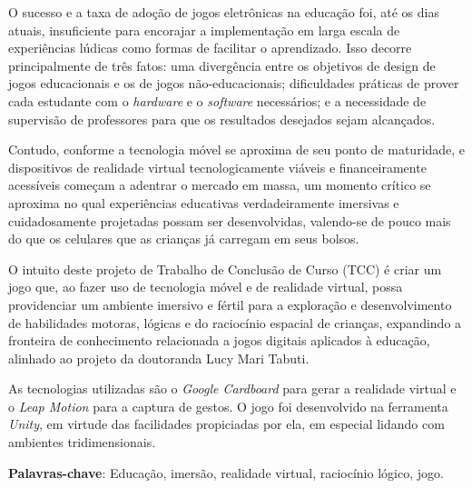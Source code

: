 \begin{resumo}
\begin{comment}
O resumo deve ser redigido, preferencialmente, na terceira pessoa do singular com verbo na voz ativa, em parágrafo único, e conter no máximo 500 palavras.
\end{comment}

O sucesso e a taxa de adoção de jogos eletrônicas na educação foi, 
até os dias atuais, insuficiente para encorajar a implementação 
em larga escala de experiências lúdicas como formas de facilitar 
o aprendizado. Isso decorre principalmente de três fatos: 
uma divergência entre os objetivos de design de jogos 
educacionais e os de jogos não-educacionais; dificuldades 
práticas de prover cada estudante com o \textit{hardware} e o \textit{software} 
necessários; e a necessidade de supervisão de professores 
para que os resultados desejados sejam alcançados.

Contudo, conforme a tecnologia móvel se aproxima de seu ponto 
de maturidade, e dispositivos de realidade virtual tecnologicamente 
viáveis e financeiramente acessíveis começam a adentrar o 
mercado em massa, um momento crítico se aproxima no qual 
experiências educativas verdadeiramente imersivas e cuidadosamente 
projetadas possam ser desenvolvidas, valendo-se de pouco mais 
do que os celulares que as crianças já carregam em seus bolsos.

O intuito deste projeto de Trabalho de Conclusão de Curso 
(TCC) é criar um jogo que, ao fazer uso de tecnologia móvel 
e de realidade virtual, possa providenciar um ambiente 
imersivo e fértil para a exploração e desenvolvimento de 
habilidades motoras, lógicas e do raciocínio espacial de 
crianças, expandindo a fronteira de conhecimento relacionada 
a jogos digitais aplicados à educação, alinhado ao projeto 
da doutoranda Lucy Mari Tabuti.

As tecnologias utilizadas são o \textit{Google Cardboard} para 
gerar a realidade virtual e o\textit{ Leap Motion} para a captura 
de gestos. O jogo foi desenvolvido na ferramenta \textit{Unity}, 
em virtude das facilidades propiciadas por ela, em 
especial lidando com ambientes tridimensionais.

 \vspace{\onelineskip}

 \noindent
 \textbf{Palavras-chave}: Educação, imersão, realidade virtual, raciocínio lógico, jogo.
\end{resumo}
 
